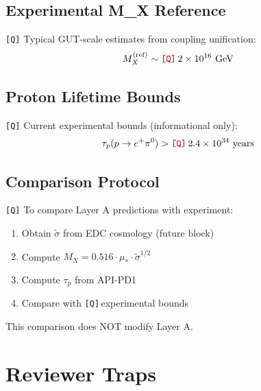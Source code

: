 \documentclass[11pt,a4paper]{article}
\newcommand{\Qnum}[1]{\textcolor{red!70!black}{\texttt{[Q]}}\,#1}
\newcommand{\tagQ}{\textcolor{red!70!black}{\texttt{[Q]}}}
\theoremstyle{definition}
\begin{document}
\subsection{Experimental M\_X Reference}
\label{subsec:exp-mx-ref}

\tagQ{} Typical GUT-scale estimates from coupling unification:
\begin{equation}
\label{eq:mx-exp-ref}
M_X^{\text{(ref)}} \sim \Qnum{2 \times 10^{16}~\text{GeV}}
\end{equation}

\subsection{Proton Lifetime Bounds}
\label{subsec:tau-bounds}

\tagQ{} Current experimental bounds (informational only):
\begin{equation}
\label{eq:tau-bound}
\tau_p(p \to e^+ \pi^0) > \Qnum{2.4 \times 10^{34}~\text{years}}
\end{equation}

\subsection{Comparison Protocol}
\label{subsec:comparison-protocol}

\tagQ{} To compare Layer A predictions with experiment:
\begin{enumerate}
  \item Obtain $\tilde{\sigma}$ from EDC cosmology (future block)
  \item Compute $M_X = 0.516 \cdot \mu_* \cdot \tilde{\sigma}^{1/2}$
  \item Compute $\tau_p$ from API-PD1
  \item Compare with \Qnum{experimental bounds}
\end{enumerate}

This comparison does NOT modify Layer A.


\newpage
\section{Reviewer Traps}
\label{sec:reviewer-traps}
\end{document}
